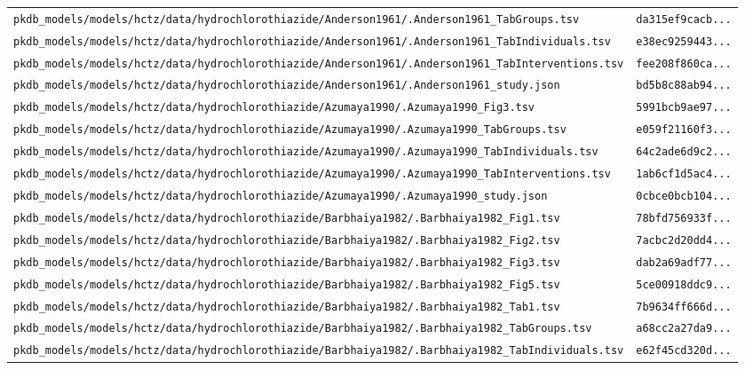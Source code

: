 \begin{longtable}{ll}
\texttt{pkdb\_models/models/hctz/data/hydrochlorothiazide/Anderson1961/.Anderson1961\_TabGroups.tsv} & \texttt{da315ef9cacb...} \\
\texttt{pkdb\_models/models/hctz/data/hydrochlorothiazide/Anderson1961/.Anderson1961\_TabIndividuals.tsv} & \texttt{e38ec9259443...} \\
\texttt{pkdb\_models/models/hctz/data/hydrochlorothiazide/Anderson1961/.Anderson1961\_TabInterventions.tsv} & \texttt{fee208f860ca...} \\
\texttt{pkdb\_models/models/hctz/data/hydrochlorothiazide/Anderson1961/.Anderson1961\_study.json} & \texttt{bd5b8c88ab94...} \\
\texttt{pkdb\_models/models/hctz/data/hydrochlorothiazide/Azumaya1990/.Azumaya1990\_Fig3.tsv} & \texttt{5991bcb9ae97...} \\
\texttt{pkdb\_models/models/hctz/data/hydrochlorothiazide/Azumaya1990/.Azumaya1990\_TabGroups.tsv} & \texttt{e059f21160f3...} \\
\texttt{pkdb\_models/models/hctz/data/hydrochlorothiazide/Azumaya1990/.Azumaya1990\_TabIndividuals.tsv} & \texttt{64c2ade6d9c2...} \\
\texttt{pkdb\_models/models/hctz/data/hydrochlorothiazide/Azumaya1990/.Azumaya1990\_TabInterventions.tsv} & \texttt{1ab6cf1d5ac4...} \\
\texttt{pkdb\_models/models/hctz/data/hydrochlorothiazide/Azumaya1990/.Azumaya1990\_study.json} & \texttt{0cbce0bcb104...} \\
\texttt{pkdb\_models/models/hctz/data/hydrochlorothiazide/Barbhaiya1982/.Barbhaiya1982\_Fig1.tsv} & \texttt{78bfd756933f...} \\
\texttt{pkdb\_models/models/hctz/data/hydrochlorothiazide/Barbhaiya1982/.Barbhaiya1982\_Fig2.tsv} & \texttt{7acbc2d20dd4...} \\
\texttt{pkdb\_models/models/hctz/data/hydrochlorothiazide/Barbhaiya1982/.Barbhaiya1982\_Fig3.tsv} & \texttt{dab2a69adf77...} \\
\texttt{pkdb\_models/models/hctz/data/hydrochlorothiazide/Barbhaiya1982/.Barbhaiya1982\_Fig5.tsv} & \texttt{5ce00918ddc9...} \\
\texttt{pkdb\_models/models/hctz/data/hydrochlorothiazide/Barbhaiya1982/.Barbhaiya1982\_Tab1.tsv} & \texttt{7b9634ff666d...} \\
\texttt{pkdb\_models/models/hctz/data/hydrochlorothiazide/Barbhaiya1982/.Barbhaiya1982\_TabGroups.tsv} & \texttt{a68cc2a27da9...} \\
\texttt{pkdb\_models/models/hctz/data/hydrochlorothiazide/Barbhaiya1982/.Barbhaiya1982\_TabIndividuals.tsv} & \texttt{e62f45cd320d...} \\

\end{longtable}
